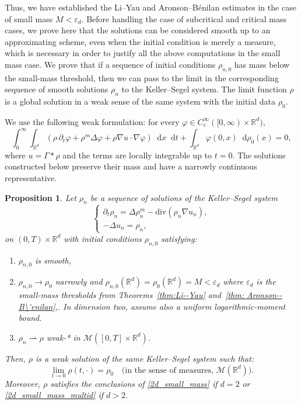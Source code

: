 \documentclass[11pt,a4paper]{article}
\numberwithin{equation}{section}
\newcommand{\R}{{\mathbb{R}}}
\theoremstyle{plain}
\newtheorem{proposition}[theorem]{Proposition}
\theoremstyle{remark}
\newcommand{\diff}{\mathop{}\!\mathrm{d}}
\begin{document}
Thus, we have established the Li--Yau and Aronson--B\'enilan estimates in the case of small mass $M < \varepsilon_d$. Before handling the case of subcritical and critical mass cases, we prove here that the solutions can be considered smooth up to an approximating scheme, even when the initial condition is merely a measure, which is necessary in order to justify all the above computations in the small mass case. 
We prove that if a sequence of initial conditions $\rho_{n,0}$ has mass below the small-mass threshold, then we can pass to the limit in the corresponding sequence of smooth solutions $\rho_n$ to the Keller--Segel system. The limit function $\rho$ is a global solution in a weak sense of the same system with the initial data $\rho_0$.

We use the following weak formulation: for every
$\varphi\in C_c^\infty([0,\infty)\times\R^d)$,
$$
\int_0^\infty\int_{\R^d}
\left(\rho\,\partial_t\varphi+\rho^m\Delta\varphi
+\rho\nabla u\cdot\nabla\varphi\right)\diff x\diff t
+\int_{\R^d}\varphi(0,x)\diff\rho_0(x)=0,
$$
where $u=\Gamma*\rho$ and the terms are locally
integrable up to $t=0$. The solutions constructed below preserve
their mass and have a narrowly continuous representative.


\begin{proposition}\label{prop:existence-small-mass}
Let $\rho_{n}$ be a sequence of solutions of the Keller--Segel system 
\[
\begin{cases}
\partial_t\rho_n = \Delta\rho_n^m - \mathrm{div}\left(\rho_n \nabla u_n\right),\\
-\Delta u_n = \rho_n,
\end{cases}
\]
on $(0,T)\times \R^d$
with initial conditions $\rho_{n,0}$ satisfying:
\begin{enumerate}
\item $\rho_{n,0}$ is smooth,
\item $\rho_{n,0}\to\rho_0$ narrowly and 
$\rho_{n,0}(\R^d)=\rho_0(\R^d)=M<\varepsilon_d$ where $\varepsilon_d$ is the small-mass thresholds from Theorems~\ref{thm:Li--Yau}  and~\ref{thm: Aronson--B\'enilan},.
In dimension two, assume also a uniform logarithmic-moment bound.
\item $\rho_n\rightharpoonup \rho$ weak-* in $\mathcal{M}([0,T]\times \mathbb{R}^d)$.
\end{enumerate}
Then, $\rho$ is a weak solution  of the same Keller--Segel system such that:
\[
\lim_{t\to 0}\rho(t,\cdot)   =   \rho_0
\quad \text{(in the sense of measures, $\mathcal{M}(\mathbb{R}^d))$}.
\]
Moreover, $\rho$ satisfies the conclusions of \ref{2d_small_mass} if $d=2$ or \ref{2d_small_mass_multid} if $d>2$. 
\end{proposition} 
\end{document}
